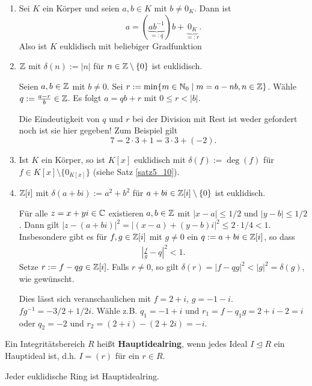 \begin{beispiel}\label{beispiel5_12}
	\begin{enumerate}[label=(\arabic*)]
		\item Sei $K$ ein Körper und seien $a,b \in K$ mit $b \neq 0_K$. Dann ist
		\[a= (\underbrace{ab^{-1}}_{=:q})b + \underbrace{0_K}_{=:r}.\]
		Also ist $K$ euklidisch mit beliebiger Gradfunktion
		\item $\mathbb{Z}$ mit $\delta(n) := |n|$ für $n \in \mathbb{Z}\setminus\{0\}$ ist euklidisch.
		\begin{inlproof}
			Seien $a,b \in \mathbb{Z}$ mit $b \neq 0$. Sei $r := \min\{m \in \mathbb{N}_0 \mid m = a-nb, n \in \mathbb{Z}\}$. Wähle $q := \frac{a-r}{b} \in \mathbb{Z}$. Es folgt $a = qb + r$ mit $0 \leq r < |b|$.
		\end{inlproof}
		Die Eindeutigkeit von $q$ und $r$ bei der Division mit Rest ist weder gefordert noch ist sie hier gegeben! Zum Beispiel gilt
		\[7 = 2 \cdot 3 + 1 = 3 \cdot 3 + (-2).\]
		\item Ist $K$ ein Körper, so ist $K[x]$ euklidisch mit $\delta(f) := \deg(f)$ für $f \in K[x] \setminus \{0_{K[x]}\}$ (siehe Satz \ref{satz5_10}).
		\item $\mathbb{Z}[i]$ mit $\delta(a + bi) := a^2 + b^2$ für $a+bi \in \mathbb{Z}[i] \setminus \{0\}$ ist euklidisch. 
		\begin{inlproof}
			Für alle $z = x+yi \in \mathbb{C}$ existieren $a,b \in \mathbb{Z}$ mit $|x-a| \leq 1/2$ und $|y-b| \leq 1/2$.  Dann gilt $|z-(a+bi)|^2 = |(x-a) + (y-b)i|^2 \leq 2 \cdot 1/4 < 1$. Insbesondere gibt es für $f,g \in \mathbb{Z}[i]$ mit $g \neq 0$ ein $q := a + bi \in \mathbb{Z}[i]$, so dass 
			\begin{align*}
				\left|\frac{f}{g} - q\right|^2 < 1.
			\end{align*}
			Setze $r := f - qg \in \mathbb{Z}[i]$. Falls $r \neq 0$, so gilt $\delta(r) = |f-qg|^2 < |g|^2 = \delta(g)$, wie gewünscht. 
		\end{inlproof}
		Dies lässt sich veranschaulichen mit $f = 2+i$, $g = -1 -i$. $fg^{-1} = -3/2 + 1/2 i$.
		Wähle z.B. $q_1 = -1 + i$ und $r_1 = f-q_1 g = 2+i -2= i$ oder $q_2 = -2$ und $r_2 = (2+i)-(2+ 2i) = -i$.
	\end{enumerate}
\end{beispiel}
\begin{definition}
	Ein Integritätsbereich $R$ heißt \textbf{Hauptidealring}, wenn jedes Ideal $I \unlhd R$ ein Hauptideal ist, d.h. $I = (r)$ für ein $r \in R$.
\end{definition}
\begin{satz}\label{satz5_14}
	Jeder euklidische Ring ist Hauptidealring.
\end{satz}
